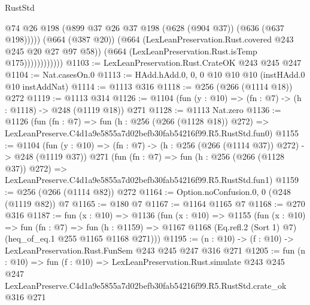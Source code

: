 \begin{lexlean}{RustStd}
\begin{coremodule}
                            @74
                            @26
                            @198
                            (@899 @37 @26 @37 @198 (@628 (@904 @37)) (@636 (@637 @198)))))
                        (@664 (@387 @20))
                        (@664 (LexLeanPreservation.Rust.covered @243 @245 @20 @27 @97 @58))
                        (@664 (LexLeanPreservation.Rust.isTemp @175))))))))))))
@1103 := LexLeanPreservation.Rust.CrateOK @243 @245 @247
@1104 := Nat.casesOn.{0}
@1113 := HAdd.hAdd.{0, 0, 0} @10 @10 @10 (instHAdd.{0} @10 instAddNat)
@1114 := @1113 @316
@1118 := @256 (@266 (@1114 @18)) @272
@1119 := @1113 @314
@1126 := @1104 (fun (y : @10) => (fn : @7) -> (h : @1118) -> @248 (@1119 @18)) @271
@1128 := @1113 Nat.zero
@1136 := @1126
    (fun (fn : @7) =>
    fun (h : @256 (@266 (@1128 @18)) @272) =>
    LexLeanPreserve.C4d1a9e5855a7d02befb30fab54216f99.R5.RustStd.fun0)
@1155 := @1104
    (fun (y : @10) => (fn : @7) -> (h : @256 (@266 (@1114 @37)) @272) -> @248 (@1119 @37))
    @271
    (fun (fn : @7) =>
    fun (h : @256 (@266 (@1128 @37)) @272) =>
    LexLeanPreserve.C4d1a9e5855a7d02befb30fab54216f99.R5.RustStd.fun1)
@1159 := @256 (@266 (@1114 @82)) @272
@1164 := Option.noConfusion.{0, 0} (@248 (@1119 @82)) @7
@1165 := @180 @7
@1167 := @1164 @1165 @7
@1168 := @270 @316
@1187 := fun (x : @10) =>
  @1136
    (fun (x : @10) =>
    @1155
      (fun (x : @10) =>
      fun (fn : @7) =>
      fun (h : @1159) =>
      @1167 @1168 (Eq.refl.{2} (Sort 1) @7) (heq_of_eq.{1} @255 @1165 @1168 @271)))
@1195 := (n : @10) -> (f : @10) -> LexLeanPreservation.Rust.FunSem @243 @245 @247 @316 @271
@1205 := fun (n : @10) =>
  fun (f : @10) =>
  LexLeanPreservation.Rust.simulate
    @243
    @245
    @247
    LexLeanPreserve.C4d1a9e5855a7d02befb30fab54216f99.R5.RustStd.crate_ok
    @316
    @271
\end{coremodule}
\end{lexlean}
